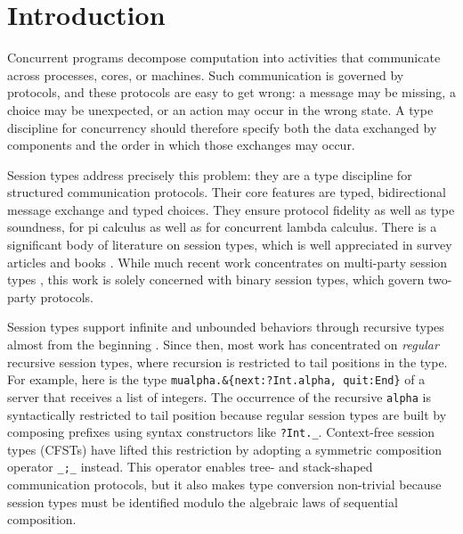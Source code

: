 
\section{Introduction}
\label{sec:introduction}

Concurrent programs decompose computation into activities that
communicate across processes, cores, or machines. Such communication is
governed by protocols, and these protocols are easy to get wrong: a
message may be missing, a choice may be unexpected, or an action may
occur in the wrong state. A type discipline for concurrency should
therefore specify both the data exchanged by components and the order
in which those exchanges may occur.

Session types
\cite{DBLP:conf/concur/Honda93,HondaVK98,Gay_Vasconcelos_2025}
address precisely this problem: they are a type discipline for
structured communication
protocols. Their core features are typed, bidirectional message
exchange and typed choices. They ensure protocol fidelity as well as type soundness,
for pi calculus as well as for concurrent lambda calculus. There is a significant body of
literature on session types, which is well appreciated in 
survey articles and books
\cite{DBLP:journals/csur/HuttelLVCCDMPRT16,
  gay17:_behav_types,
  DBLP:journals/ftpl/AnconaBB0CDGGGH16,
  Gay_Vasconcelos_2025}. 
While much recent work concentrates on multi-party session types
\cite{DBLP:journals/jacm/HondaYC16}, this work is solely concerned
with binary session types, which govern two-party protocols.

Session types support infinite and unbounded behaviors through
recursive types almost from the beginning \cite{HondaVK98}. Since
then, most work has concentrated on \emph{regular} recursive session
types, where recursion is restricted to tail positions in the
type. For example, here is the type
\lstinline|mualpha.&{next:?Int.alpha, quit:End}|
of a server that receives a list of integers. The occurrence of
the recursive \lstinline{alpha} is syntactically restricted to tail
position because regular session types are built by composing prefixes
using syntax constructors like \lstinline{?Int._}. Context-free session types
\cite{DBLP:conf/icfp/ThiemannV16,DBLP:journals/iandc/AlmeidaMTV22} (CFSTs)
have lifted this restriction by adopting a symmetric composition
operator \lstinline{_;_} instead. This operator
enables tree- and stack-shaped communication protocols, but it also
makes type conversion non-trivial because session types must be
identified modulo the algebraic laws of sequential composition.

